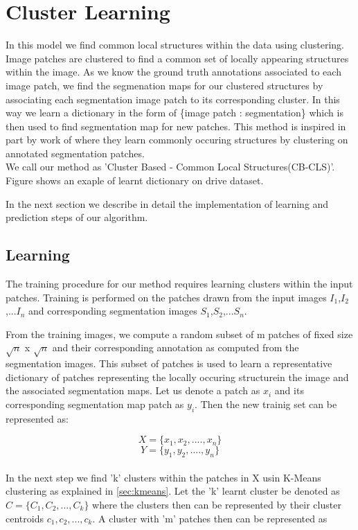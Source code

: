 
\section{Cluster Learning}
In this model we find common local structures within the data using clustering. Image patches are clustered to find a common set of locally appearing structures within the image. As we know the ground truth annotations associated to each image patch, we find the segmenation maps for our clustered structures by associating each segmentation image patch to its corresponding cluster. In this way we learn a dictionary in the form of \{image patch : segmentation\} which is then used to find segmentation map for new patches. This method is inspired in part by work of \citep{lim2013sketch} where they learn commonly occuring structures by clustering on annotated segmentation patches.\\
We call our method as 'Cluster Based - Common Local Structures(CB-CLS)'. Figure shows an exaple of learnt dictionary on drive dataset.

In the next section we describe in detail the implementation of learning and prediction steps of our algorithm.

\subsection{Learning}

The training procedure for our method requires learning clusters within the input patches. Training is performed on the patches drawn from the input images $I_1$,$I_2$,...$I_n$ and corresponding segmentation images $S_1$,$S_2$,...$S_n$. 

From the training images, we compute a random subset of m patches of fixed size $\sqrt{n}$ x $\sqrt{n}$ and their corresponding annotation as computed from the segmentation images. This subset of patches is used to learn a representative dictionary of patches representing the locally occuring structurein the image and the associated segmentation maps. Let us denote a patch as $x_i$ and its corresponding segmentation map patch as $y_i$. Then the new trainig set can be represented as:

$$
X = \{x_1,x_2,....,x_n\}
$$
$$
Y = \{y_1,y_2,....,y_n\}
$$
\\
In the next step we find 'k' clusters within the patches in X usin K-Means clustering as explained in \ref{sec:kmeans}. Let the 'k' learnt cluster be denoted as $C = \{C_1,C_2,...,C_k\} $ where the clusters then can be represented by their cluster centroids $c_1, c_2,..., c_k$. A cluster with 'm' patches then can be represented as

